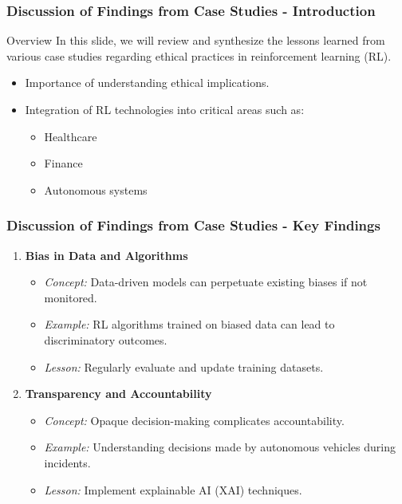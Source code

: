 \documentclass{beamer}
\begin{document}
\begin{frame}[fragile]
    \frametitle{Discussion of Findings from Case Studies - Introduction}
    \begin{block}{Overview}
        In this slide, we will review and synthesize the lessons learned from various case studies regarding ethical practices in reinforcement learning (RL). 
        \begin{itemize}
            \item Importance of understanding ethical implications.
            \item Integration of RL technologies into critical areas such as:
            \begin{itemize}
                \item Healthcare
                \item Finance
                \item Autonomous systems
            \end{itemize}
        \end{itemize}
    \end{block}
\end{frame}

\begin{frame}[fragile]
    \frametitle{Discussion of Findings from Case Studies - Key Findings}
    \begin{enumerate}
        \item \textbf{Bias in Data and Algorithms}
            \begin{itemize}
                \item \textit{Concept:} Data-driven models can perpetuate existing biases if not monitored.
                \item \textit{Example:} RL algorithms trained on biased data can lead to discriminatory outcomes.
                \item \textit{Lesson:} Regularly evaluate and update training datasets.
            \end{itemize}

        \item \textbf{Transparency and Accountability}
            \begin{itemize}
                \item \textit{Concept:} Opaque decision-making complicates accountability.
                \item \textit{Example:} Understanding decisions made by autonomous vehicles during incidents.
                \item \textit{Lesson:} Implement explainable AI (XAI) techniques.
            \end{itemize}
    \end{enumerate}
\end{frame}
\end{document}
